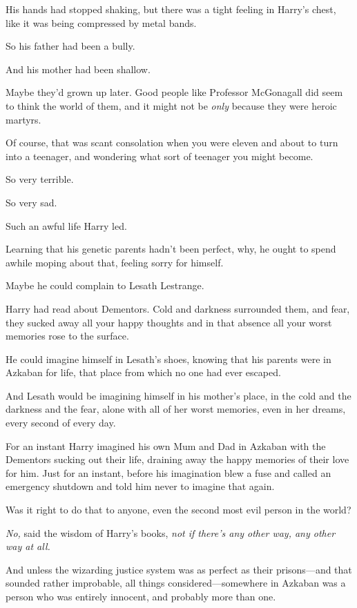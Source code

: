 His hands had stopped shaking, but there was a tight feeling in Harry's chest, 
like it was being compressed by metal bands.

So his father had been a bully.

And his mother had been shallow.

Maybe they'd grown up later. Good people like Professor McGonagall did seem to 
think the world of them, and it might not be \emph{only} because they were 
heroic martyrs.

Of course, that was scant consolation when you were eleven and about to turn 
into a teenager, and wondering what sort of teenager you might become.

So very terrible.

So very sad.

Such an awful life Harry led.

Learning that his genetic parents hadn't been perfect, why, he ought to spend 
awhile moping about that, feeling sorry for himself.

Maybe he could complain to Lesath Lestrange.

Harry had read about Dementors. Cold and darkness surrounded them, and fear, 
they sucked away all your happy thoughts and in that absence all your worst 
memories rose to the surface.

He could imagine himself in Lesath's shoes, knowing that his parents were in 
Azkaban for life, that place from which no one had ever escaped.

And Lesath would be imagining himself in his mother's place, in the cold and 
the darkness and the fear, alone with all of her worst memories, even in her 
dreams, every second of every day.

For an instant Harry imagined his own Mum and Dad in Azkaban with the Dementors 
sucking out their life, draining away the happy memories of their love for him. 
Just for an instant, before his imagination blew a fuse and called an emergency 
shutdown and told him never to imagine that again.

Was it right to do that to anyone, even the second most evil person in the 
world?

\emph{No,} said the wisdom of Harry's books, \emph{not if there's any other 
way, any other way at all.}

And unless the wizarding justice system was as perfect as their prisons---and 
that sounded rather improbable, all things considered---somewhere in Azkaban 
was a person who was entirely innocent, and probably more than one.

